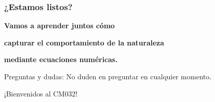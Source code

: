\begin{frame}
	\frametitle{¿Estamos listos?}

	\centering
	\vspace{1cm}

	{\Large \textbf{Vamos a aprender juntos cómo}}

	{\Large \textbf{capturar el comportamiento de la naturaleza}}

	{\Large \textbf{mediante ecuaciones numéricas.}}

	\vspace{1cm}

	{\large Preguntas y dudas: No duden en preguntar en cualquier momento.}

	\vspace{1cm}

	¡Bienvenidos al CM032!
\end{frame}
